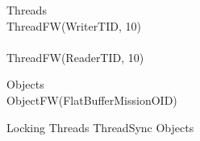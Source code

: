 %
\begin{circus}
\circprocess Threads \circdef  \\
\circblockopen
ThreadFW(WriterTID, 10) \\
\interleave \\
ThreadFW(ReaderTID, 10) \\

\circblockclose
\end{circus}
%
%
\begin{circus}
\circprocess Objects \circdef \\
\circblockopen
ObjectFW(FlatBufferMissionOID) \\

\circblockclose
\end{circus}
%
%
\begin{circus}
\circprocess Locking \circdef Threads \lpar ThreadSync \rpar Objects
\end{circus}
